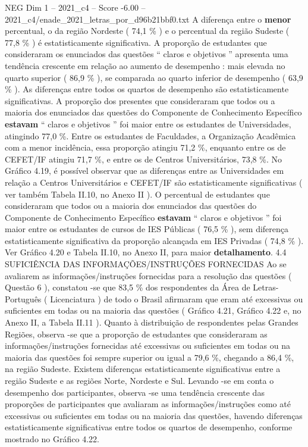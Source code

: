 \begin{textsample}{NEG Dim 1 – 2021\_c4 – Score -6.00 – 2021\_c4/enade\_2021\_letras\_por\_d96b21bbf0.txt}
A diferença entre o \textbf{menor} percentual, o da região Nordeste ( 74,1 \% ) e o percentual da região Sudeste ( 77,8 \% ) é estatisticamente significativa.
A proporção de estudantes que consideraram os enunciados das questões “ claros e objetivos ” apresenta uma tendência crescente em relação ao aumento de desempenho : mais elevada no quarto superior ( 86,9 \% ), se comparada ao quarto inferior de desempenho ( 63,9 \% ).
As diferenças entre todos os quartos de desempenho são estatisticamente significativas.
A proporção dos presentes que consideraram que todos ou a maioria dos enunciados das questões do Componente de Conhecimento Específico \textbf{estavam} “ claros e objetivos ” foi maior entre os estudantes de Universidades, atingindo 77,0 \%.
Entre os estudantes de Faculdades, a Organização Acadêmica com a menor incidência, essa proporção atingiu 71,2 \%, enquanto entre os de CEFET/IF atingiu 71,7 \%, e entre os de Centros Universitários, 73,8 \%.
No Gráfico 4.19, é possível observar que as diferenças entre as Universidades em relação a Centros Universitários e CEFET/IF são estatisticamente significativas ( ver também Tabela II.10, no Anexo II ).
O percentual de estudantes que consideraram que todos ou a maioria dos enunciados das questões do Componente de Conhecimento Específico \textbf{estavam} “ claros e objetivos ” foi maior entre os estudantes de cursos de IES Públicas ( 76,5 \% ), sem diferença estatisticamente significativa da proporção alcançada em IES Privadas ( 74,8 \% ).
Ver Gráfico 4.20 e Tabela II.10, no Anexo II, para maior \textbf{detalhamento}. 4.4 SUFICIÊNCIA DAS INFORMAÇÕES/INSTRUÇÕES FORNECIDAS Ao se avaliarem as informações/instruções fornecidas para a resolução das questões ( Questão 6 ), constatou -se que 83,5 \% dos respondentes da Área de Letras-Português ( Licenciatura ) de todo o Brasil afirmaram que eram até excessivas ou suficientes em todas ou na maioria das questões ( Gráfico 4.21, Gráfico 4.22 e, no Anexo II, a Tabela II.11 ).
Quanto à distribuição de respondentes pelas Grandes Regiões, observa -se que a proporção de estudantes que consideraram as informações/instruções fornecidas até excessivas ou suficientes em todas ou na maioria das questões foi sempre superior ou igual a 79,6 \%, chegando a 86,4 \%, na região Sudeste.
Existem diferenças estatisticamente significativas entre a região Sudeste e as regiões Norte, Nordeste e Sul.
Levando -se em conta o desempenho dos participantes, observa -se uma tendência crescente das proporções de participantes que avaliaram as informações/instruções como até excessivas ou suficientes em todas ou na maioria das questões, havendo diferenças estatisticamente significativas entre todos os quartos de desempenho, conforme mostrado no Gráfico 4.22.

\end{textsample}
